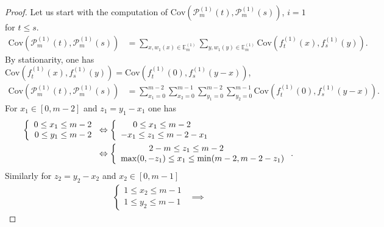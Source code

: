 \documentclass[12pt]{article}
\theoremstyle{Theorem}
\begin{document}
\begin{proof}
Let us start with the computation of $\text{Cov}(\mathcal{P}_{m}^{\scriptscriptstyle (1)}(t), \mathcal{P}_{m}^{\scriptscriptstyle (1)}(s))$, $i = 1$for $t \leq s$. 
\begin{align*}
\text{Cov}(\mathcal{P}_{m}^{\scriptscriptstyle (1)}(t), \mathcal{P}_{m}^{\scriptscriptstyle (1)}(s))& = \sum_{x, w_{1}(x) \in \mathbb{E}^{\scriptscriptstyle (1)}_{m}} \sum_{y, w_{1}(y) \in \mathbb{E}^{\scriptscriptstyle (1)}_{m}} \text{Cov}\left(f_{t}^{\scriptscriptstyle (1)}(x), f_{s}^{\scriptscriptstyle (1)}(y) \right).
\end{align*}
By stationarity, one has $\text{Cov}\left(f_{t}^{\scriptscriptstyle (1)}(x), f_{s}^{\scriptscriptstyle (1)}(y) \right)= \text{Cov}\left(f_{t}^{\scriptscriptstyle (1)}(0), f_{s}^{\scriptscriptstyle (1)}(y-x) \right)$, 
\begin{align*}
\text{Cov}\left(\mathcal{P}_{m}^{\scriptscriptstyle (1)}(t),\mathcal{P}_{m}^{\scriptscriptstyle (1)}(s) \right) & = \sum_{x_1 = 0}^{m-2}\sum_{x_2 = 0}^{m-1}\sum_{y_1 = 0}^{m-2}\sum_{y_2 = 0}^{m-1} \text{Cov}\left(f_{t}^{\scriptscriptstyle (1)}(0), f_{s}^{ \scriptscriptstyle (1)}(y-x) \right).
\end{align*}
For $x_1 \in [0,m-2]$ and $z_1 = y_1 - x_1$ one has
\begin{align*} 
\left\{
\begin{array}{rcl}
0 \leq x_1 \leq m-2 \\
0 \leq y_1 \leq m-2 
\end{array}\right.& \Leftrightarrow  \left\{ \begin{array}{rcl}
0 \leq x_1 \leq m-2 \hspace{0.7cm} \\
-x_1 \leq z_1 \leq m-2 - x_1
\end{array}\right. \\
& \Leftrightarrow  \left\{
\begin{array}{rcl}
2-m \leq z_1 \leq m-2 \hspace{2.5cm}  \\
\max(0, -z_1) \leq x_1 \leq \min(m-2 , m-2-z_1)
\end{array}\right..
\end{align*} 
Similarly for $z_2 = y_2 - x_2$ and $x_2 \in [0, m-1]$
\begin{align*}
 \left\{
\begin{array}{rcl}
1 \leq x_2 \leq m-1 \\
1 \leq y_2 \leq m-1 
\end{array}\right. & \implies

\end{align*}
\end{proof}
\end{document}
